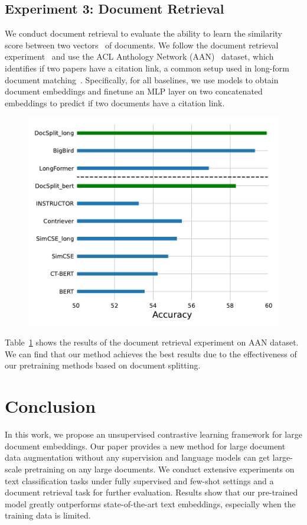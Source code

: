 \documentclass[11pt]{article}
\begin{document}
\subsection{Experiment 3: Document Retrieval}
We conduct document retrieval to evaluate the ability to learn the similarity score between two vectors~\cite{Guo2016ADR} of documents. We follow the document retrieval experiment~\cite{Tay2020LongRA} and use the ACL Anthology Network (AAN)~\cite{Radev2009TheAA} dataset, which identifies if two papers have a citation link, a common setup used in long-form document matching~\cite{Jiang2019SemanticTM,Yang2020Beyond5T}.
Specifically, for all baselines, we use models to obtain document embeddings and finetune an MLP layer on two concatenated embeddings to predict if two documents have a citation link.

%   

\begin{figure}
\centering
\includegraphics[width=0.8\linewidth]{fig/retrieval_fig.pdf}
\caption{}  
\label{retrieval}
\end{figure}



Table~\ref{retrieval} shows the results of the document retrieval experiment on AAN dataset.
We can find that our method achieves the best results due to the effectiveness of our pretraining methods based on document splitting.

\section{Conclusion}
\label{sec:conclusion}
In this work, we propose an unsupervised contrastive learning framework for large document embeddings. 
Our paper provides a new method for large document data augmentation without any supervision and language models can get large-scale pretraining on any large documents. 
We conduct extensive experiments on text classification tasks under fully supervised and few-shot settings and a document retrieval task for further evaluation.
Results show that our pre-trained model greatly outperforms state-of-the-art text embeddings, especially when the training data is limited.
\end{document}
